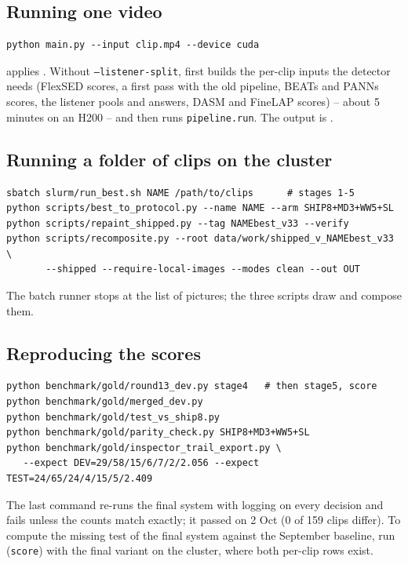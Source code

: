 \subsection{Running one video}
\begin{verbatim}
python main.py --input clip.mp4 --device cuda
\end{verbatim}
 applies . Without \texttt{--listener-split},  first builds the
per-clip inputs the detector needs (FlexSED scores, a first pass with the old pipeline, BEATs and PANNs scores, the
listener pools and answers, DASM and FineLAP scores) -- about 5 minutes on an H200 -- and then runs
\texttt{pipeline.run}. The output is .

\subsection{Running a folder of clips on the cluster}
\begin{verbatim}
sbatch slurm/run_best.sh NAME /path/to/clips      # stages 1-5
python scripts/best_to_protocol.py --name NAME --arm SHIP8+MD3+WW5+SL
python scripts/repaint_shipped.py --tag NAMEbest_v33 --verify
python scripts/recomposite.py --root data/work/shipped_v_NAMEbest_v33 \
       --shipped --require-local-images --modes clean --out OUT
\end{verbatim}
The batch runner stops at the list of pictures; the three scripts draw and compose them.

\subsection{Reproducing the scores}
\begin{verbatim}
python benchmark/gold/round13_dev.py stage4   # then stage5, score
python benchmark/gold/merged_dev.py
python benchmark/gold/test_vs_ship8.py
python benchmark/gold/parity_check.py SHIP8+MD3+WW5+SL
python benchmark/gold/inspector_trail_export.py \
   --expect DEV=29/58/15/6/7/2/2.056 --expect TEST=24/65/24/4/15/5/2.409
\end{verbatim}
The last command re-runs the final system with logging on every decision and fails unless the counts match exactly; it passed on
2 Oct (0 of 159 clips differ). To compute the missing test of the final system against the September baseline, run  (\texttt{score}) with
the final variant on the cluster, where both per-clip rows exist.

